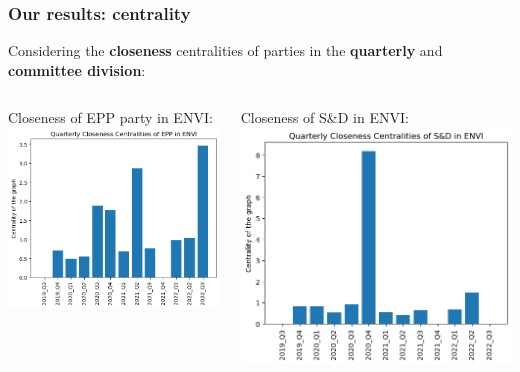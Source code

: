 \documentclass{beamer}
\begin{document}
\begin{frame}
\frametitle{Our results: centrality}
	
	Considering the \textbf{closeness} centralities of parties in the \textbf{quarterly} and \textbf{committee division}:
	\vspace{4mm}
	\pause
	
\begin{columns}
	\begin{column}{0.5\textwidth}
	Closeness of EPP party in ENVI:
	\\
	\includegraphics[width=\textwidth]{img/EPP_ENVI_Q_closeness.png}
	\end{column}
	
	\pause 
	\begin{column}{0.5\textwidth}
	Closeness of S\&D in ENVI:
	\includegraphics[width=\textwidth]{img/S&D_ENVI_Q_closeness.png}
	\end{column}
	
\end{columns}
\end{frame}
\end{document}
